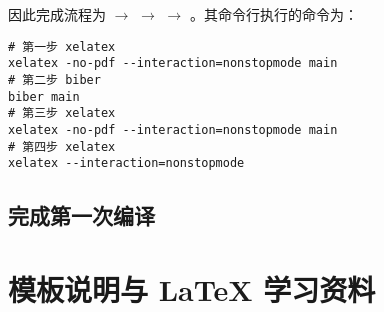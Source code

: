 因此完成流程为   $\rightarrow$  $\rightarrow$  $\rightarrow$  。其命令行执行的命令为：

\begin{verbatim}
# 第一步 xelatex
xelatex -no-pdf --interaction=nonstopmode main
# 第二步 biber
biber main
# 第三步 xelatex
xelatex -no-pdf --interaction=nonstopmode main
# 第四步 xelatex
xelatex --interaction=nonstopmode

\end{verbatim}

\subsection{完成第一次编译}

\section{模板说明与 LaTeX 学习资料}

